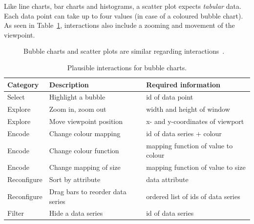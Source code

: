 Like line charts, bar charts and histograms, a scatter plot expects \emph{tabular} data.
Each data point can take up to four values (in case of a coloured bubble chart).
As seen in Table~\ref{tab:analysis:bubble-charts:interactions}, interactions also include a zooming and movement of the viewpoint.

\begin{figure}
  \centering
  \qquad
  \caption{Bubble charts and scatter plots are similar regarding interactions~\parencite{VisualizationCatalogue2017}.}%
  \label{fig:analysis:bubble-chart}
\end{figure}

\begin{table}[H]
  \caption{Plausible interactions for bubble charts.}%
  \label{tab:analysis:bubble-charts:interactions}
  \begin{tabularx}{\linewidth}{lXX}
    \bf Category & \bf Description & \bf Required information \\
    \hline
    Select & Highlight a bubble & id of data point \\
    Explore & Zoom in, zoom out & width and height of window \\
    Explore & Move viewpoint position & x- and y-coordinates of viewport \\
    Encode & Change colour mapping & id of data series + colour \\
    Encode & Change colour function & mapping function of value to colour \\
    Encode & Change mapping of size & mapping function of value to size \\
    Reconfigure & Sort by attribute & data attribute \\
    Reconfigure & Drag bars to reorder data series & ordered list of ids of data series \\
    Filter & Hide a data series & id of data series \\
  \end{tabularx}
\end{table}

